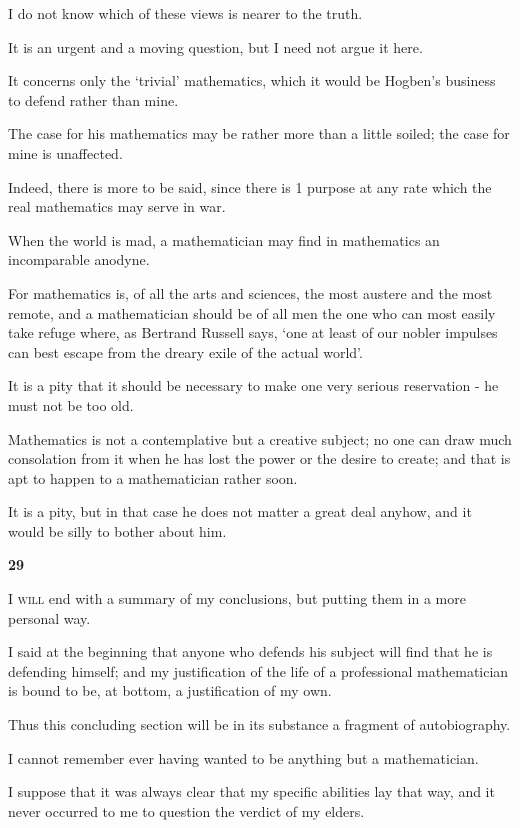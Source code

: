 \documentclass{article}
\numberwithin{equation}{section}
\begin{document}
%
I do not know which of these views is nearer to the truth.

It is an urgent and a moving question, but I need not argue it here.

It concerns only the `trivial' mathematics, which it would be Hogben's business to defend rather than mine.

The case for his mathematics may be rather more than a little soiled; the case for mine is unaffected.

%
Indeed, there is more to be said, since there is 1 purpose at any rate which the real mathematics may serve in war.

When the world is mad, a mathematician may find in mathematics an incomparable anodyne.

For mathematics is, of all the arts and sciences, the most austere and the most remote, and a mathematician should be of all men the one who can most easily take refuge where, as Bertrand Russell says, `one at least of our nobler impulses can best escape from the dreary exile of the actual world'.

It is a pity that it should be necessary to make one very serious reservation - he must not be too old.

Mathematics is not a contemplative but a creative subject; no one can draw much consolation from it when he has lost the power or the desire to create; and that is apt to happen to a mathematician rather soon.

It is a pity, but in that case he does not matter a great deal anyhow, and it would be silly to bother about him.

\begin{center}
    \large\textbf{29}
\end{center}
\textsc{I will} end with a summary of my conclusions, but putting them in a more personal way.

I said at the beginning that anyone who defends his subject will find that he is defending himself; and my justification of the life of a professional mathematician is bound to be, at bottom, a justification of my own.

Thus this concluding section will be in its substance a fragment of autobiography.

%
I cannot remember ever having wanted to be anything but a mathematician.

I suppose that it was always clear that my specific abilities lay that way, and it never occurred to me to question the verdict of my elders.
\end{document}
